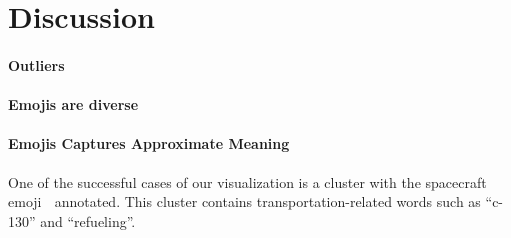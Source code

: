 \section{Discussion}

\paragraph{Outliers} 

\paragraph{Emojis are diverse} 

\paragraph{Emojis Captures Approximate Meaning} 
One of the successful cases of our visualization is a cluster with the spacecraft emoji 🚀 annotated. This cluster contains transportation-related words such as ``c-130'' and ``refueling''. 
